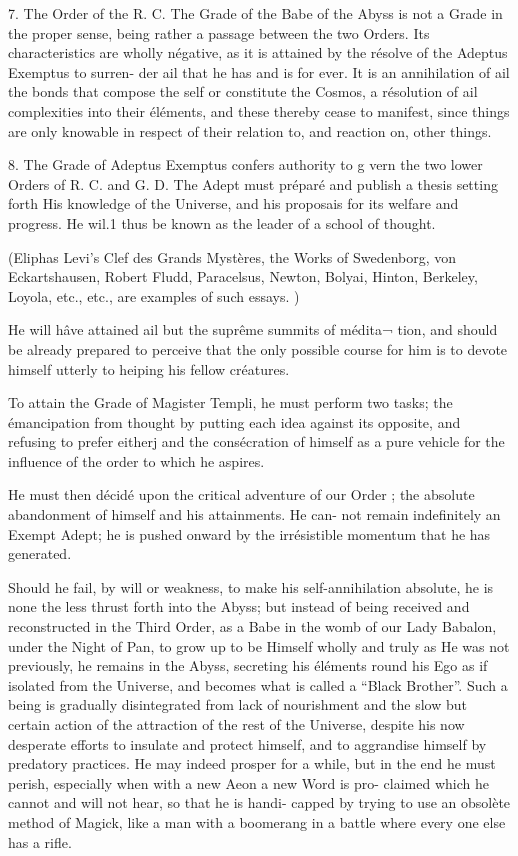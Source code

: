 7. The Order of the R. C. The Grade of the Babe of the Abyss is not a Grade in the proper sense, being rather a passage between the two Orders. Its characteristics are wholly négative, as it is attained by the résolve of the Adeptus Exemptus to surren- der ail that he has and is for ever. It is an annihilation of ail the bonds that compose the self or constitute the Cosmos, a résolution of ail complexities into their éléments, and these thereby cease to manifest, since things are only knowable in respect of their relation to, and reaction on, other things.

8. The Grade of Adeptus Exemptus confers authority to g vern the two lower Orders of R. C. and G. D. The Adept must préparé and publish a thesis setting forth His knowledge of the Universe, and his proposais for its welfare and progress. He wil.1 thus be known as the leader of a school of thought.

(Eliphas Levi’s Clef des Grands Mystères, the Works of Swedenborg, von Eckartshausen, Robert Fludd, Paracelsus, Newton, Bolyai, Hinton, Berkeley, Loyola, etc., etc., are examples of such essays. )

He will hâve attained ail but the suprême summits of médita¬ tion, and should be already prepared to perceive that the only possible course for him is to devote himself utterly to heiping his fellow créatures.

To attain the Grade of Magister Templi, he must perform two tasks; the émancipation from thought by putting each idea against its opposite, and refusing to prefer eitherj and the consécration of himself as a pure vehicle for the influence of the order to which he aspires.

He must then décidé upon the critical adventure of our Order ; the absolute abandonment of himself and his attainments. He can- not remain indefinitely an Exempt Adept; he is pushed onward by the irrésistible momentum that he has generated.

Should he fail, by will or weakness, to make his self-annihilation absolute, he is none the less thrust forth into the Abyss; but instead of being received and reconstructed in the Third Order, as a Babe in the womb of our Lady Babalon, under the Night of Pan, to grow up to be Himself wholly and truly as He was not previously, he remains in the Abyss, secreting his éléments round his Ego as if isolated from the Universe, and becomes what is called a “Black Brother”. Such a being is gradually disintegrated from lack of nourishment and the slow but certain action of the attraction of the rest of the Universe, despite his now desperate efforts to insulate and protect himself, and to aggrandise himself by predatory practices. He may indeed prosper for a while, but in the end he must perish, especially when with a new Aeon a new Word is pro- claimed which he cannot and will not hear, so that he is handi- capped by trying to use an obsolète method of Magick, like a man with a boomerang in a battle where every one else has a rifle.

